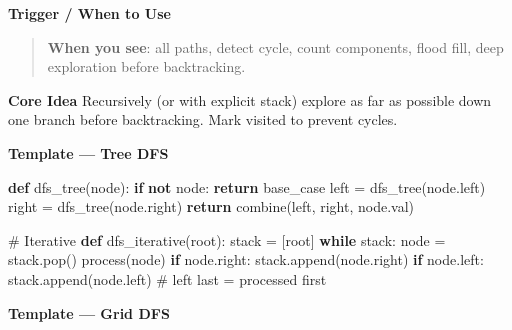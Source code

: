 \documentclass[11pt]{article}
\newenvironment{Shaded}{\begin{snugshade}}{\end{snugshade}}
\newcommand{\CommentTok}[1]{\textcolor[rgb]{0.48,0.49,0.49}{#1}}
\newcommand{\ControlFlowTok}[1]{\textcolor[rgb]{0.99,0.74,0.29}{\textbf{#1}}}
\newcommand{\KeywordTok}[1]{\textcolor[rgb]{0.81,0.81,0.76}{\textbf{#1}}}
\newcommand{\NormalTok}[1]{\textcolor[rgb]{0.81,0.81,0.76}{#1}}
\newcommand{\OperatorTok}[1]{\textcolor[rgb]{0.81,0.81,0.76}{#1}}
\begin{document}
\textbf{Trigger / When to Use}

\begin{quote}
\textbf{When you see}: all paths, detect cycle, count components, flood fill, deep exploration before backtracking.
\end{quote}

\textbf{Core Idea}
Recursively (or with explicit stack) explore as far as possible down one branch before backtracking. Mark visited to prevent cycles.

\textbf{Template --- Tree DFS}


\begin{Shaded}
\begin{Highlighting}[]
\KeywordTok{def}\NormalTok{ dfs\_tree(node):}
    \ControlFlowTok{if} \KeywordTok{not}\NormalTok{ node:}
        \ControlFlowTok{return}\NormalTok{ base\_case}
\NormalTok{    left }\OperatorTok{=}\NormalTok{ dfs\_tree(node.left)}
\NormalTok{    right }\OperatorTok{=}\NormalTok{ dfs\_tree(node.right)}
    \ControlFlowTok{return}\NormalTok{ combine(left, right, node.val)}

\CommentTok{\# Iterative}
\KeywordTok{def}\NormalTok{ dfs\_iterative(root):}
\NormalTok{    stack }\OperatorTok{=}\NormalTok{ [root]}
    \ControlFlowTok{while}\NormalTok{ stack:}
\NormalTok{        node }\OperatorTok{=}\NormalTok{ stack.pop()}
\NormalTok{        process(node)}
        \ControlFlowTok{if}\NormalTok{ node.right: stack.append(node.right)}
        \ControlFlowTok{if}\NormalTok{ node.left:  stack.append(node.left)    }\CommentTok{\# left last = processed first}
\end{Highlighting}
\end{Shaded}

\textbf{Template --- Grid DFS}

\end{document}
